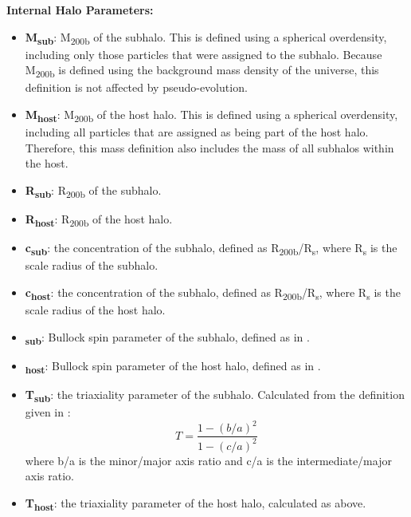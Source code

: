 \documentclass[fleqn,usenatbib]{mnras}
\begin{document}
\vskip 0.1in
    \noindent\textbf{Internal Halo Parameters:}
    \begin{itemize}[leftmargin=.4cm,topsep=0pt]
        \item \textbf{M\textsubscript{sub}}: M\textsubscript{200b} of the subhalo. This is defined using a spherical overdensity, including only those particles that were assigned to the subhalo. Because M\textsubscript{200b} is defined using the background mass density of the universe, this definition is not affected by pseudo-evolution.
        \item \textbf{M\textsubscript{host}}: M\textsubscript{200b} of the host halo. This is defined using a spherical overdensity, including all particles that are assigned as being part of the host halo. Therefore, this mass definition also includes the mass of all subhalos within the host.
        \item \textbf{R\textsubscript{sub}}: R\textsubscript{200b} of the subhalo.
        \item \textbf{R\textsubscript{host}}: R\textsubscript{200b} of the host halo.
        \item \textbf{c\textsubscript{sub}}: the concentration of the subhalo, defined as R\textsubscript{200b}/R\textsubscript{s}, where R\textsubscript{s} is the scale radius of the subhalo.
        \item \textbf{c\textsubscript{host}}: the concentration of the subhalo, defined as R\textsubscript{200b}/R\textsubscript{s}, where R\textsubscript{s} is the scale radius of the host halo.
        \item \textbf{\textlambda\textsubscript{sub}}: Bullock spin parameter of the subhalo, defined as in \citet{Bullock2001}.
        \item \textbf{\textlambda\textsubscript{host}}: Bullock spin parameter of the host halo, defined as in \citet{Bullock2001}.
        \item \textbf{T\textsubscript{sub}}: the triaxiality parameter of the subhalo. Calculated from the definition given in \citet{Franx1991}:
        \begin{equation}
            T = \frac{1 - (b/a)^2}{1 - (c/a)^2}
        \end{equation}
        where b/a is the minor/major axis ratio and c/a is the intermediate/major axis ratio.
        \item \textbf{T\textsubscript{host}}:  the triaxiality parameter of the host halo, calculated as above.
    \end{itemize}
\vskip 0.1in
\end{document}
